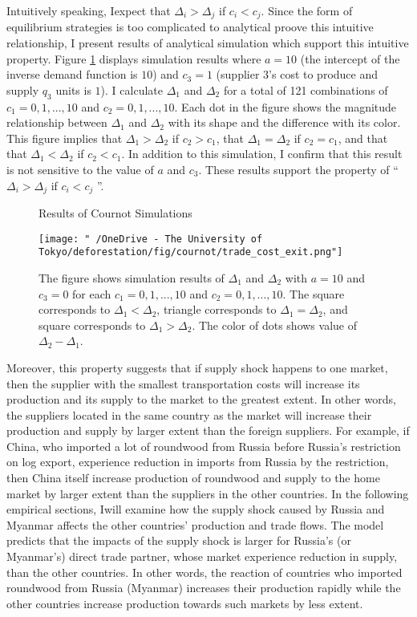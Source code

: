 \documentclass[a4paper,12pt]{article}
\begin{document}
Intuitively speaking, Iexpect that $\Delta_i > \Delta_j$ if $c_i < c_j$. Since the form of equilibrium strategies is too complicated to analytical proove this intuitive relationship, I present results of analytical simulation which support this intuitive property. Figure \ref{fig:cournot_simulation} displays simulation results where $a = 10$ (the intercept of the inverse demand function is $10$) and $c_3 = 1$ (supplier $3$'s cost to produce and supply $q_3$ units is $1$). I calculate $\Delta_1$ and $\Delta_2$ for a total of 121 combinations of $c_1 = 0, 1, ..., 10$ and $c_2 = 0, 1, ..., 10$. Each dot in the figure shows the magnitude relationship between $\Delta_1$ and $\Delta_2$ with its shape and the difference with its color. This figure implies that $\Delta_1 > \Delta_2$ if $c_2 > c_1$, that $\Delta_1 = \Delta_2$ if $c_2 = c_1$, and that that $\Delta_1 < \Delta_2$ if $c_2 < c_1$. In addition to this simulation, I confirm that this result is not sensitive to the value of $a$ and $c_3$. These results support the property of ``$\Delta_i > \Delta_j$ if $c_i < c_j$ ''. \\

\begin{figure}[H] 
    \centering
    \caption{Results of Cournot Simulations}
    \texttt{[image: "~/OneDrive - The University of Tokyo/deforestation/fig/cournot/trade\_cost\_exit.png"]}
    \caption*{\small{The figure shows simulation results of $\Delta_1$ and $\Delta_2$ with $a = 10$ and $c_3 = 0$ for each $c_1 = 0, 1, ..., 10$ and $c_2 = 0, 1, ..., 10$. The square corresponds to $\Delta_1 < \Delta_2$, triangle corresponds to $\Delta_1 = \Delta_2$, and square corresponds to $\Delta_1 > \Delta_2$. The color of dots shows value of $\Delta_2 - \Delta_1$.}}
    \label{fig:cournot_simulation}
\end{figure}

Moreover, this property suggests that if supply shock happens to one market, then the supplier with the smallest transportation costs will increase its production and its supply to the market to the greatest extent. In other words, the suppliers located in the same country as the market will increase their production and supply by larger extent than the foreign suppliers. For example, if China, who imported a lot of roundwood from Russia before Russia's restriction on log export, experience reduction in imports from Russia by the restriction, then China itself increase production of roundwood and supply to the home market by larger extent than the suppliers in the other countries. In the following empirical sections, Iwill examine how the supply shock caused by Russia and Myanmar affects the other countries' production and trade flows. The model predicts that the impacts of the supply shock is larger for Russia's (or Myanmar's) direct trade partner, whose market experience reduction in supply, than the other countries. In other words, the reaction of countries who imported roundwood from Russia (Myanmar) increases their production rapidly while the other countries increase production towards such markets by less extent.
\end{document}
